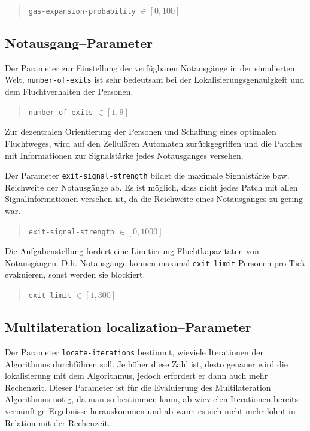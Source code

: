 \begin{quote}
\verb|gas-expansion-probability| $\in [0, 100]$
\end{quote}


\subsection{Notausgang--Parameter}
\label{sec:gui_exit}

Der Parameter zur Einstellung der verfügbaren Notausgänge in der simulierten Welt, 
\verb|number-of-exits| ist sehr bedeutsam bei der Lokalisierungsgenauigkeit und dem Fluchtverhalten der Personen.

\begin{quote}
\verb|number-of-exits| $\in [1, 9]$
\end{quote}

Zur dezentralen Orientierung der Personen und Schaffung eines optimalen Fluchtweges, wird auf den Zellulären Automaten zurückgegriffen und die Patches mit Informationen zur Signalstärke jedes Notausganges versehen.\par
Der Parameter \verb|exit-signal-strength| bildet die maximale Signalstärke bzw. Reichweite der Notausgänge ab. Es ist möglich, dass nicht jedes Patch mit allen Signalinformationen versehen ist, da die Reichweite eines Notausganges zu gering war.

\begin{quote}
\verb|exit-signal-strength| $\in [0, 1000]$
\end{quote}

Die Aufgabenstellung fordert eine Limitierung Fluchtkapazitäten von Notausgängen. D.h. Notausgänge können maximal \verb|exit-limit| Personen pro Tick evakuieren, sonst werden sie blockiert.

\begin{quote}
\verb|exit-limit| $\in [1, 300]$
\end{quote}

\subsection{Multilateration localization--Parameter}
\label{sec:gui_localization}

Der Parameter \verb|locate-iterations| bestimmt, wieviele Iterationen der Algorithmus durchführen soll. Je höher diese Zahl ist, desto genauer wird die lokalisierung mit dem Algorithmus, jedoch erfordert er dann auch mehr Rechenzeit. Dieser Parameter ist für die Evaluierung des Multilateration Algorithmus nötig, da man so bestimmen kann, ab wievielen Iterationen bereits vernünftige Ergebnisse herauskommen und ab wann es sich nicht mehr lohnt in Relation mit der Rechenzeit.

